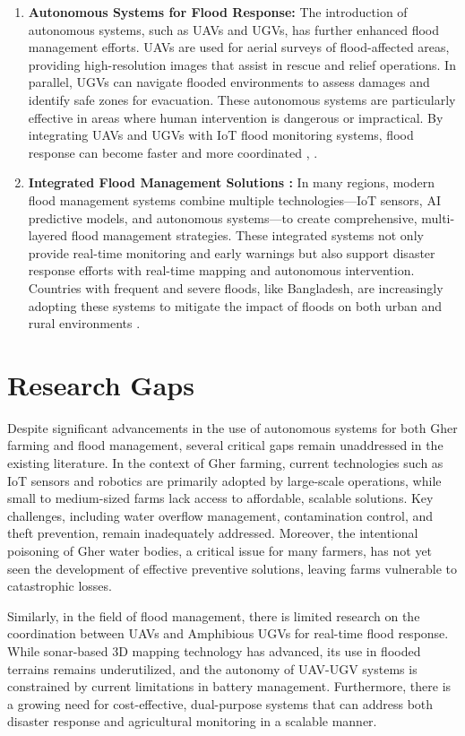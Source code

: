 \documentclass[conference]{IEEEtran}
\begin{document}
\begin{enumerate}
\item \textbf{Autonomous Systems for Flood Response: }
The introduction of autonomous systems, such as UAVs and UGVs, has further enhanced flood management efforts. UAVs are used for aerial surveys of flood-affected areas, providing high-resolution images that assist in rescue and relief operations. In parallel, UGVs can navigate flooded environments to assess damages and identify safe zones for evacuation. These autonomous systems are particularly effective in areas where human intervention is dangerous or impractical. By integrating UAVs and UGVs with IoT flood monitoring systems, flood response can become faster and more coordinated \cite{ref13}, \cite{ref14}.

\item \textbf{Integrated Flood Management Solutions : }
In many regions, modern flood management systems combine multiple technologies—IoT sensors, AI predictive models, and autonomous systems—to create comprehensive, multi-layered flood management strategies. These integrated systems not only provide real-time monitoring and early warnings but also support disaster response efforts with real-time mapping and autonomous intervention. Countries with frequent and severe floods, like Bangladesh, are increasingly adopting these systems to mitigate the impact of floods on both urban and rural environments \cite{ref15}.

\end{enumerate}



\section{\textbf{Research Gaps}}
Despite significant advancements in the use of autonomous systems for both Gher farming and flood management, several critical gaps remain unaddressed in the existing literature. In the context of Gher farming, current technologies such as IoT sensors and robotics are primarily adopted by large-scale operations, while small to medium-sized farms lack access to affordable, scalable solutions. Key challenges, including water overflow management, contamination control, and theft prevention, remain inadequately addressed. Moreover, the intentional poisoning of Gher water bodies, a critical issue for many farmers, has not yet seen the development of effective preventive solutions, leaving farms vulnerable to catastrophic losses.

Similarly, in the field of flood management, there is limited research on the coordination between UAVs and Amphibious UGVs for real-time flood response. While sonar-based 3D mapping technology has advanced, its use in flooded terrains remains underutilized, and the autonomy of UAV-UGV systems is constrained by current limitations in battery management. Furthermore, there is a growing need for cost-effective, dual-purpose systems that can address both disaster response and agricultural monitoring in a scalable manner.
\end{document}
